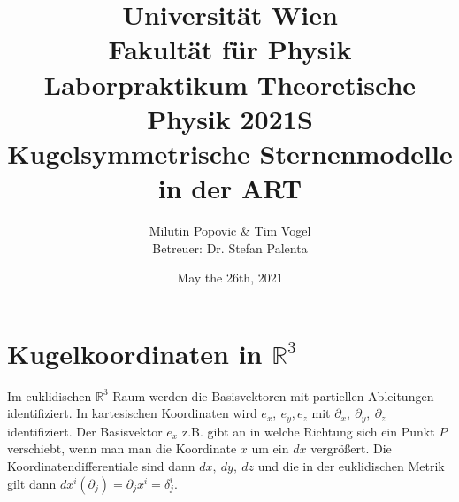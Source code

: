 \documentclass[a4paper]{article}
\title{Universität Wien\\ Fakultät für Physik\\
\vspace{1.25cm}Laborpraktikum Theoretische Physik 2021S \\ Kugelsymmetrische Sternenmodelle in der ART
}
\author{Milutin Popovic \& Tim Vogel \vspace{1cm}\\ Betreuer: Dr. Stefan
Palenta}
\date{May the 26th, 2021}
\begin{document}
\maketitle
\tableofcontents
\newpage
\section{Kugelkoordinaten in $\mathbb{R}^3$}
Im euklidischen $\mathbb{R}^3$ Raum werden die Basisvektoren mit partiellen
Ableitungen identifiziert. In kartesischen Koordinaten wird $e_x,\ e_y, e_z$
mit $\partial _x,\ \partial _y,\ \partial _z$ identifiziert. Der
Basisvektor $e_x$ z.B. gibt an in welche Richtung sich ein Punkt $P$
verschiebt, wenn man man die Koordinate $x$ um ein $dx$ vergrößert. Die
Koordinatendifferentiale sind dann $dx,\ dy,\ dz$ und die in der euklidischen
Metrik gilt dann $dx^i(\partial _j) = \partial_j x^i = \delta^i_j$.
\end{document}
